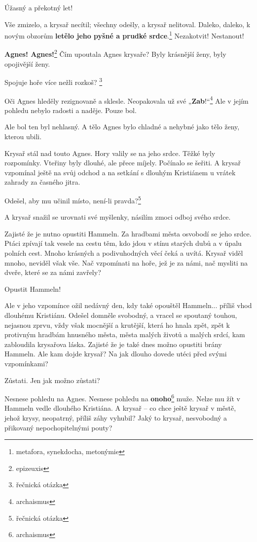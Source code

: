 \documentclass[10pt,a4paper]{article}
\begin{document}
Úžasný a překotný let!

Vše zmizelo, a krysař necítil; všechny odešly, a krysař nelitoval. Daleko, daleko, k novým obzorům \textbf{letělo jeho pyšné a prudké srdce}.\footnote{metafora, synekdocha, metonýmie} Nezakotvit! Nestanout!

\textbf{Agnes! Agnes!}\footnote{epizeuxis} Čím upoutala Agnes krysaře? Byly krásnější ženy, byly opojivější ženy.

Spojuje hoře více nežli rozkoš? \footnote{řečnická otázka}

Oči Agnes hleděly rezignovaně a sklesle. Neopakovala už své „\textbf{Zab}!“\footnote{archaismus} Ale v jejím pohledu nebylo radosti a naděje. Pouze bol.

Ale bol ten byl nehlasný. A tělo Agnes bylo chladné a nehybné jako tělo ženy, kterou ubili.

Krysař stál nad touto Agnes. Hory valily se na jeho srdce. Těžké byly rozpomínky. Vteřiny byly dlouhé, ale přece míjely. Počínalo se šeřiti. A krysař vzpomínal ještě na svůj odchod a na setkání s dlouhým Kristiánem u vrátek zahrady za časného jitra.

Odešel, aby mu učinil místo, není-li pravda?\footnote{řečnická otázka}

A krysař snažil se urovnati své myšlenky, násilím zmoci odboj svého srdce.

Zajisté že je nutno opustiti Hammeln. Za hradbami města osvobodí se jeho srdce. Ptáci zpívají tak vesele na cestu těm, kdo jdou v stínu starých dubů a v úpalu polních cest. Mnoho krásných a podivuhodných věcí čeká a uvítá. Krysař viděl mnoho, neviděl však vše. Nač vzpomínati na hoře, jež je za námi, nač mysliti na dveře, které se za námi zavřely?

Opustit Hammeln!

Ale v jeho vzpomínce ožil nedávný den, kdy také opouštěl Hammeln... příliš vhod dlouhému Kristiánu. Odešel domněle svobodný, a vracel se spoutaný touhou, nejasnou zprvu, vždy však mocnější a krutější, která ho hnala zpět, zpět k protivným hradbám hnusného města, města malých životů a malých srdcí, kam zabloudila krysařova láska. Zajisté že je také dnes možno opustiti brány Hammeln. Ale kam dojde krysař? Na jak dlouho dovede utéci před svými vzpomínkami?

Zůstati. Jen jak možno zůstati?

Nesnese pohledu na Agnes. Nesnese pohledu na \textbf{onoho}\footnote{archaismus} muže. Nelze mu žít v Hammeln vedle dlouhého Kristiána. A krysař – co chce ještě krysař v městě, jehož krysy, neopatrný, příliš záhy vyhubil? Jaký to krysař, nesvobodný a přikovaný nepochopitelnými pouty?
\end{document}
